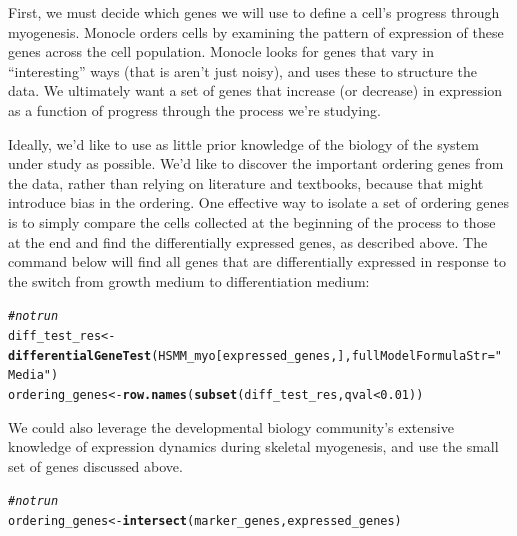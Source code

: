 \documentclass[10pt,oneside]{article}\usepackage[]{graphicx}\usepackage[]{color}
\makeatletter
\newcommand{\hlnum}[1]{\textcolor[rgb]{0.686,0.059,0.569}{#1}}%
\newcommand{\hlstr}[1]{\textcolor[rgb]{0.192,0.494,0.8}{#1}}%
\newcommand{\hlcom}[1]{\textcolor[rgb]{0.678,0.584,0.686}{\textit{#1}}}%
\newcommand{\hlopt}[1]{\textcolor[rgb]{0,0,0}{#1}}%
\newcommand{\hlstd}[1]{\textcolor[rgb]{0.345,0.345,0.345}{#1}}%
\newcommand{\hlkwb}[1]{\textcolor[rgb]{0.69,0.353,0.396}{#1}}%
\newcommand{\hlkwc}[1]{\textcolor[rgb]{0.333,0.667,0.333}{#1}}%
\newcommand{\hlkwd}[1]{\textcolor[rgb]{0.737,0.353,0.396}{\textbf{#1}}}%
\newenvironment{kframe}{%
 \def\at@end@of@kframe{}%
 \ifinner\ifhmode%
  \def\at@end@of@kframe{\end{minipage}}%
  \begin{minipage}{\columnwidth}%
 \fi\fi%
 \def\FrameCommand##1{\hskip\@totalleftmargin \hskip-\fboxsep
 \colorbox{shadecolor}{##1}\hskip-\fboxsep
     \hskip-\linewidth \hskip-\@totalleftmargin \hskip\columnwidth}%
 \MakeFramed {\advance\hsize-\width
   \@totalleftmargin\z@ \linewidth\hsize
   \@setminipage}}%
 {\par\unskip\endMakeFramed%
 \at@end@of@kframe}
\newenvironment{knitrout}{}{} %
\makeatother
\begin{document}
First, we must decide which genes we will use to define a cell's progress through myogenesis. Monocle orders cells by examining the pattern of expression of these genes across the cell population.  Monocle looks for genes that vary in ``interesting'' ways (that is aren't just noisy), and uses these to structure the data. We ultimately want a set of genes that increase (or decrease) in expression as a function of progress through the process we're studying. 

Ideally, we'd like to use as little prior knowledge of the biology of the system under study as possible. We'd like to discover the important ordering genes from the data, rather than relying on literature and textbooks, because that might introduce bias in the ordering. One effective way to isolate a set of ordering genes is to simply compare the cells collected at the beginning of the process to those at the end and find the differentially expressed genes, as described above. The command below will find all genes that are differentially expressed in response to the switch from growth medium to differentiation medium:

\begin{knitrout}
\color{fgcolor}\begin{kframe}
\begin{alltt}
\hlcom{#not run}
\hlstd{diff_test_res} \hlkwb{<-} \hlkwd{differentialGeneTest}\hlstd{(HSMM_myo[expressed_genes,],} \hlkwc{fullModelFormulaStr}\hlstd{=}\hlstr{"~Media"}\hlstd{)}
\hlstd{ordering_genes} \hlkwb{<-} \hlkwd{row.names} \hlstd{(}\hlkwd{subset}\hlstd{(diff_test_res, qval} \hlopt{<} \hlnum{0.01}\hlstd{))}
\end{alltt}
\end{kframe}
\end{knitrout}

We could also leverage the developmental biology community's extensive knowledge of expression dynamics during skeletal myogenesis, and use the small set of genes discussed above. 

\begin{knitrout}
\color{fgcolor}\begin{kframe}
\begin{alltt}
\hlcom{#not run}
\hlstd{ordering_genes} \hlkwb{<-} \hlkwd{intersect} \hlstd{(marker_genes, expressed_genes)}
\end{alltt}
\end{kframe}
\end{knitrout}
\end{document}
